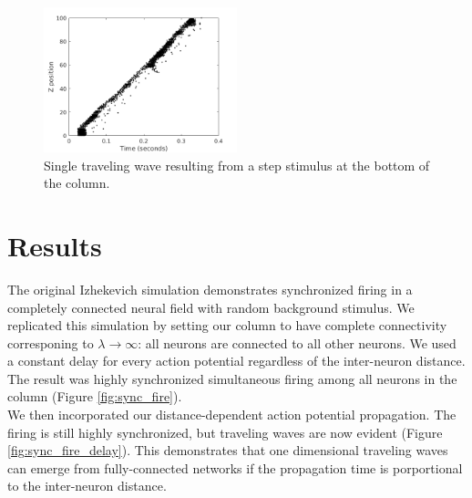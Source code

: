 \documentclass[a4paper,11pt]{article}
\begin{document}
\begin{figure}[!htb]
 \caption{Single traveling wave resulting from a step stimulus at the bottom of the column.}
 \label{fig:wave_example}
 \centering
   \includegraphics[width=0.5\textwidth]{fig/TypicalWave}
\end{figure}


\section{Results}
The original Izhekevich simulation \cite{izzy_code} demonstrates synchronized firing in a completely connected neural field with random background stimulus.
We replicated this simulation by setting our column to have complete connectivity corresponing to $\lambda \rightarrow \infty$: all neurons are connected to all other neurons.
We used a constant delay for every action potential regardless of the inter-neuron distance.
The result was highly synchronized simultaneous firing among all neurons in the column (Figure \ref{fig:sync_fire}). \\ 
We then incorporated our distance-dependent action potential propagation. 
The firing is still highly synchronized, but traveling waves are now evident (Figure \ref{fig:sync_fire_delay}).
This demonstrates that one dimensional traveling waves can emerge from fully-connected networks if the propagation time is porportional to the inter-neuron distance.
\end{document}
